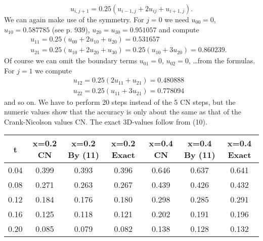 \begin{equation*}\tag{21.11}
u_{i,j+1}=0.25(u_{i-1,j}+2u_{ij}+u_{i+1,j}).
\end{equation*}
We can again make use of the symmetry. For $j=0$ we need $u_{00}=0$, $u_{10}=0.587785$ (see p. 939), $u_{20}=u_{30}=0.951057$ and compute
\begin{equation*}
\begin{split}
u_{11}=0.25(u_{00}+2u_{10}+u_{20})=0.531657 \hspace{88pt} &\\
u_{21}=0.25(u_{10}+2u_{20}+u_{30})=0.25(u_{10}+3u_{20})=0.860239.
\end{split}
\end{equation*}
Of course we can omit the boundary terms $u_{01}=0$, $u_{02}=0$, \dots from the formulas. For $j=1$ we compute
\begin{equation*}
\begin{split}
u_{12}=0.25(2u_{11}+u_{21})=0.480888 &\\
u_{22}=0.25(u_{11}+3u_{21})=0.778094 
\end{split}
\end{equation*}
and so on. We have to perform 20 steps instead of the 5 CN steps, but the numeric values show that the accuracy is only about the same as that of the Crank-Nicolson values CN. The exact 3D-values follow from (10).
\begin{table}[htp]
\begin{center}
\begin{tabular}{|c c c c c c c|}
\hline t & {\tiny{x=0.2}} CN & {\tiny{x=0.2}} By (11) & {\tiny{x=0.2}} Exact & {\tiny{x=0.4}} CN & {\tiny{x=0.4}} By (11) & {\tiny{x=0.4}} Exact \\ \hline
0.04 & 0.399 & 0.393 & 0.396 & 0.646 & 0.637 & 0.641 \\
0.08 & 0.271 & 0.263 & 0.267 & 0.439 & 0.426 & 0.432 \\
0.12 & 0.184 & 0.176 & 0.180 & 0.298 & 0.285 & 0.291 \\
0.16 & 0.125 & 0.118 & 0.121 & 0.202 & 0.191 & 0.196 \\
0.20 & 0.085 & 0.079 & 0.082 & 0.138 & 0.128 & 0.132 \\ \hline
\end{tabular}
\end{center}
\end{table}%
